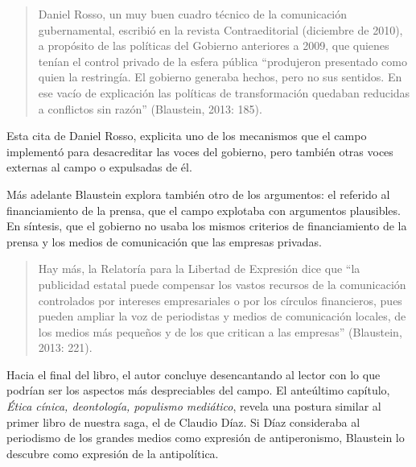 \begin{quote}
Daniel Rosso, un muy buen cuadro técnico de la comunicación gubernamental, escribió en la revista Contraeditorial (diciembre de 2010), a propósito de las políticas del Gobierno anteriores a 2009, que quienes tenían el control privado de la esfera pública \enquote{produjeron  presentado como quien la restringía. El gobierno generaba hechos, pero no sus sentidos. En ese vacío de explicación las políticas de transformación quedaban reducidas a conflictos sin razón} (Blaustein, 2013: 185).
\end{quote}

Esta cita de Daniel Rosso, explicita uno de los mecanismos que el campo implementó para desacreditar las voces del gobierno, pero también otras voces externas al campo o expulsadas de él.

Más adelante Blaustein explora también otro de los argumentos: el referido al financiamiento de la prensa, que el campo explotaba con argumentos plausibles. En síntesis, que el gobierno no usaba los mismos criterios de financiamiento de la prensa y los medios de comunicación que las empresas privadas.

\begin{quote}
Hay más, la Relatoría para la Libertad de Expresión dice que \enquote{la publicidad estatal puede compensar los vastos recursos de la comunicación controlados por intereses empresariales o por los círculos financieros, pues pueden ampliar la voz de periodistas y medios de comunicación locales, de los medios más pequeños y de los que critican a las empresas} (Blaustein, 2013: 221).
\end{quote}

Hacia el final del libro, el autor concluye desencantando al lector con lo que podrían ser los aspectos más despreciables del campo. El anteúltimo capítulo, \emph{Ética cínica, deontología, populismo mediático}, revela una postura similar al primer libro de nuestra saga, el de Claudio Díaz. Si Díaz consideraba al periodismo de los grandes medios como expresión de antiperonismo, Blaustein lo descubre como expresión de la antipolítica.

